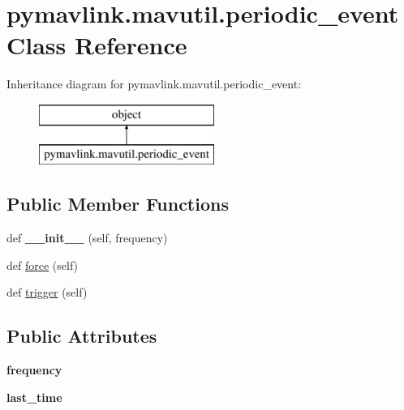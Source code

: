\hypertarget{classpymavlink_1_1mavutil_1_1periodic__event}{}\section{pymavlink.\+mavutil.\+periodic\+\_\+event Class Reference}
\label{classpymavlink_1_1mavutil_1_1periodic__event}
Inheritance diagram for pymavlink.\+mavutil.\+periodic\+\_\+event\+:\begin{figure}[H]
\begin{center}
\leavevmode
\includegraphics[height=2.000000cm]{classpymavlink_1_1mavutil_1_1periodic__event}
\end{center}
\end{figure}
\subsection*{Public Member Functions}
\begin{DoxyCompactItemize}
\item 
\mbox{\label{classpymavlink_1_1mavutil_1_1periodic__event_af45cf18064b3defb11eb5581b101be7e}} 
def {\bfseries \+\_\+\+\_\+init\+\_\+\+\_\+} (self, frequency)
\item 
def \hyperlink{classpymavlink_1_1mavutil_1_1periodic__event_a2a5504d296287adeb13b14a5476977ef}{force} (self)
\item 
def \hyperlink{classpymavlink_1_1mavutil_1_1periodic__event_ae4845b6df5d98c26357ca74346df1363}{trigger} (self)
\end{DoxyCompactItemize}
\subsection*{Public Attributes}
\begin{DoxyCompactItemize}
\item 
\mbox{\label{classpymavlink_1_1mavutil_1_1periodic__event_aa08aac52084bedb4cefac51ee2421e99}} 
{\bfseries frequency}
\item 
\mbox{\label{classpymavlink_1_1mavutil_1_1periodic__event_ab270b81812ba5bdd088a807ed240d8f5}} 
{\bfseries last\+\_\+time}
\end{DoxyCompactItemize}
